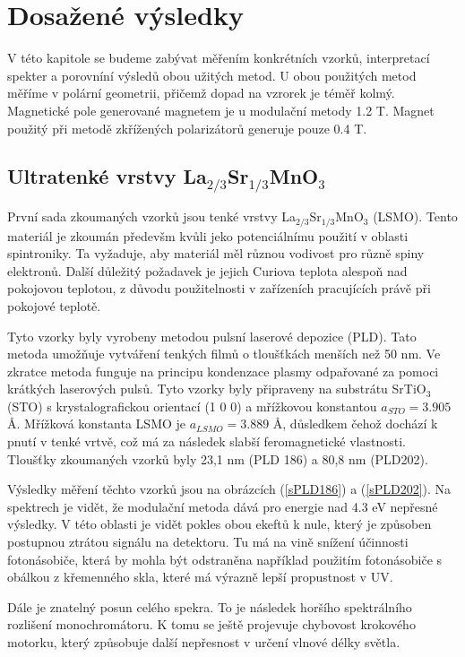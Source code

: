 \chapter{Dosažené výsledky}
V této kapitole se budeme zabývat měřením konkrétních vzorků, interpretací spekter a porovníní výsledů obou užitých metod. U obou použitých 
metod měříme v polární geometrii, přičemž dopad na vzrorek je téměř kolmý. Magnetické pole generované magnetem je u modulační metody 1.2 T. Magnet 
použitý při metodě zkřížených polarizátorů generuje pouze 0.4 T.

\section{Ultratenké vrstvy La$_{2/3}$Sr$_{1/3}$MnO$_3$}
První sada zkoumaných vzorků jsou tenké vrstvy La$_{2/3}$Sr$_{1/3}$MnO$_3$ (LSMO). Tento materiál je zkoumán předevšm kvůli jeko potenciálnímu použití v oblasti spintroniky. 
Ta vyžaduje, aby materiál měl různou vodivost pro různě spiny elektronů. Další důležitý požadavek je jejich Curiova teplota alespoň nad pokojovou teplotou, z důvodu 
použitelnosti v zařízeních pracujících právě při pokojové teplotě.

Tyto vzorky byly vyrobeny metodou pulsní laserové depozice (PLD). Tato metoda umožňuje vytváření tenkých filmů o tloušťkách menších než 50 nm. Ve zkratce metoda funguje na principu kondenzace plasmy odpařované za pomoci krátkých laserových pulsů. 
Tyto vzorky byly připraveny na substrátu SrTiO$_3$ (STO) s krystalografickou orientací (1 0 0) 
a mřížkovou konstantou $a_{STO}=3.905$ \AA. Mřížková konstanta LSMO je $a_{LSMO}=3.889$ \AA, důsledkem čehož dochází k pnutí v tenké vrtvě, což má za následek slabší feromagnetické vlastnosti. 
Tloušťky zkoumaných vzorků byly 23,1 nm (PLD 186) a 80,8 nm (PLD202). 

Výsledky měření těchto vzorků jsou na obrázcích (\ref{sPLD186}) a (\ref{sPLD202}).
Na spektrech je vidět, že modulační metoda 
dává pro energie nad 4.3 eV nepřesné výsledky. V této oblasti je vidět pokles obou ekeftů k nule, 
který je způsoben postupnou ztrátou signálu na detektoru. Tu má na vině 
snížení účinnosti fotonásobiče, která by mohla být odstraněna například použitím fotonásobiče s obálkou z křemenného skla, které má výrazně lepší propustnost v UV.

Dále je znatelný posun celého spekra. To je následek horšího spektrálního rozlišení monochromátoru. K tomu se ještě projevuje chybovost krokového motorku, který 
způsobuje další nepřesnost v určení vlnové délky světla.


